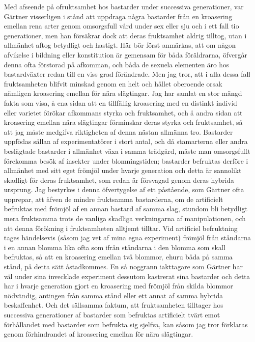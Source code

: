 Med afseende på ofruktsamhet hos bastarder under successiva generationer, var Gärtner visserligen i stånd att uppdraga några bastarder från en kroasering emellan rena arter genom omsorgsfull vård under sex eller sju och i ett fall tio generationer, men han försäkrar dock att deras fruktsamhet aldrig tilltog, utan i allmänhet aftog betydligt och hastigt. Här bör först anmärkas, att om någon afvikelse i bildning eller konstitution är gemensam för båda föräldrarna, öfvergår denna ofta förstorad på afkomman, och båda de sexuela elementen äro hos bastardväxter redan till en viss grad förändrade. Men jag tror, att i alla dessa fall fruktsamheten blifvit minskad genom en helt och hållet oberoende orsak nämligen kroasering emellan för nära slägtingar. Jag har samlat en stor mängd fakta som visa, å ena sidan att en tillfällig kroasering med en distinkt individ eller varietet förökar afkommans styrka och fruktsamhet, och å andra sidan att kroasering emellan nära slägtingar förminskar deras styrka och fruktsamhet, så att jag måste medgifva riktigheten af denna nästan allmänna tro. Bastarder uppfödas sällan af experimentatörer i stort antal, och då stamarterna eller andra beslägtade bastarder i allmänhet växa i samma trädgård, måste man omsorgsfullt förekomma besök af insekter under blomningstiden; bastarder befruktas derföre i allmänhet med sitt eget frömjöl under hvarje generation och detta är sannolikt skadligt för deras fruktsamhet, som redan är försvagad genom deras hybrida ursprung. Jag bestyrkes i denna öfvertygelse af ett påstående, som Gärtner ofta upprepar, att äfven de mindre fruktsamma bastarderna, om de artificielt befruktas med frömjöl af en annan bastard af samma slag, stundom bli betydligt mera fruktsamma trots de vanliga skadliga verkningarna af manipulationen, och att denna förökning i fruktsamheten alltjemt tilltar. Vid artificiel befruktning tages händelsevis (såsom jag vet af mina egna experiment) frömjöl från ståndarna i en annan blomma lika ofta som ifrån ståndarna i den blomma som skall befruktas, så att en kroasering emellan två blommor, ehuru båda på samma stånd, på detta sätt åstadkommes. En så noggrann iakttagare som Gärtner har väl under sina invecklade experiment dessutom kastrerat sina bastarder och detta har i hvarje generation gjort en kroasering med frömjöl från skilda blommor nödvändig, antingen från samma stånd eller ett annat af samma hybrida beskaffenhet. Och det sällsamma faktum, att fruktsamheten tilltager hos successiva generationer af bastarder som befruktas artificielt tvärt emot förhållandet med bastarder som befrukta sig sjelfva, kan såsom jag tror förklaras genom förhindrandet af kroasering emellan för nära slägtingar.

